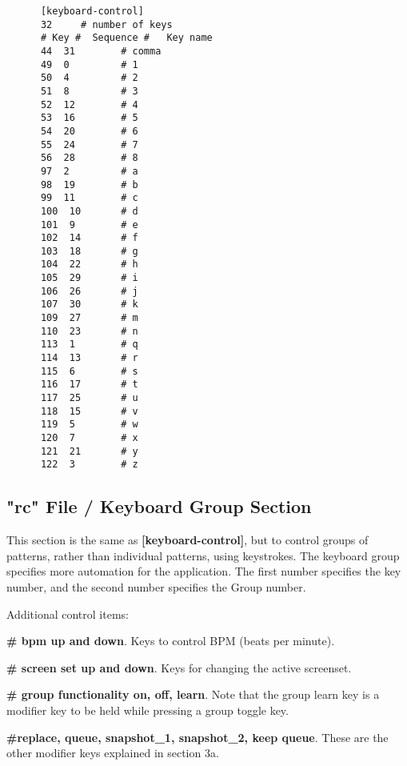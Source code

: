    \begin{verbatim}
      [keyboard-control]
      32     # number of keys
      # Key #  Sequence #   Key name
      44  31        # comma
      49  0         # 1
      50  4         # 2
      51  8         # 3
      52  12        # 4
      53  16        # 5
      54  20        # 6
      55  24        # 7
      56  28        # 8
      97  2         # a
      98  19        # b
      99  11        # c
      100  10       # d
      101  9        # e
      102  14       # f
      103  18       # g
      104  22       # h
      105  29       # i
      106  26       # j
      107  30       # k
      109  27       # m
      110  23       # n
      113  1        # q
      114  13       # r
      115  6        # s
      116  17       # t
      117  25       # u
      118  15       # v
      119  5        # w
      120  7        # x
      121  21       # y
      122  3        # z
   \end{verbatim}

\subsection{"rc" File / Keyboard Group Section}
\label{subsec:rc_file_keyboard_group}

   This section is the same as
   \textbf{[keyboard-control]}, but to control groups of patterns, rather than
   individual patterns, using keystrokes.
   The keyboard group specifies more automation for the application.  The
   first number specifies the key number, and the second number specifies
   the Group number.

   Additional control items:

   \begin{enumber}
      \item \textbf{\# bpm up and down}.
         Keys to control BPM (beats per minute).
      \item \textbf{\# screen set up and down}.
         Keys for changing the active screenset.
      \item \textbf{\# group functionality on, off, learn}.
         Note that the group learn key is a modifier key to be held while 
         pressing a group toggle key.
      \item \textbf{\#replace, queue, snapshot\_1, snapshot\_2, keep queue}.
         These are the other modifier keys explained in section 3a.
   \end{enumber}

